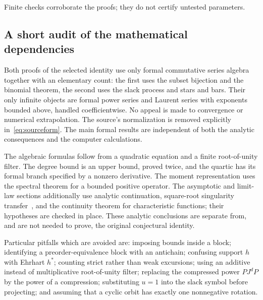 \documentclass[11pt]{article}
\numberwithin{equation}{section}
\theoremstyle{definition}
\begin{document}
Finite checks corroborate the proofs; they do not certify untested parameters.

\subsection{A short audit of the mathematical dependencies}
Both proofs of the selected identity use only formal commutative series
algebra together with an elementary count: the first uses the subset bijection
and the binomial theorem, the second uses the slack process and stars and
bars. Their only infinite objects are formal power series and Laurent series
with exponents bounded above, handled coefficientwise. No appeal is made to
convergence or numerical extrapolation. The source's normalization is removed
explicitly in~\eqref{eq:sourceform}. The main formal results are independent
of both the analytic consequences and the computer calculations.

The algebraic formulas follow from a quadratic equation and a finite
root-of-unity filter. The degree bound is an upper bound, proved twice, and
the quartic has its formal branch specified by a nonzero derivative. The
moment representation uses the spectral theorem for a bounded positive
operator. The asymptotic and limit-law sections additionally use analytic
continuation, square-root singularity transfer~\cite{FO}, and the continuity
theorem for characteristic functions; their hypotheses are checked in place.
These analytic conclusions are separate from, and are not needed to prove, the
original conjectural identity.

Particular pitfalls which are avoided are: imposing bounds inside a block;
identifying a preorder-equivalence block with an antichain; confusing support
$h$ with Ehrhart $h^*$; counting strict rather than weak excursions; using an
additive instead of multiplicative root-of-unity filter; replacing the
compressed power $PJ^dP$ by the power of a compression; substituting $u=1$
into the slack symbol before projecting; and assuming that a cyclic orbit has
exactly one nonnegative rotation.
\end{document}
